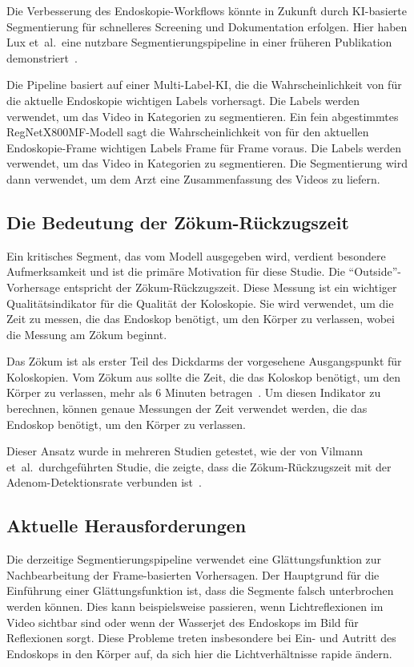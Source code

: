 Die Verbesserung des Endoskopie-Workflows könnte in Zukunft durch KI-basierte Segmentierung für schnelleres Screening und Dokumentation erfolgen. Hier haben Lux et~al.\ eine nutzbare Segmentierungspipeline in einer früheren Publikation demonstriert~\citep{lux-2023}.

Die Pipeline basiert auf einer Multi-Label-KI, die die Wahrscheinlichkeit von für die aktuelle Endoskopie wichtigen Labels vorhersagt. Die Labels werden verwendet, um das Video in Kategorien zu segmentieren. Ein fein abgestimmtes RegNetX800MF-Modell sagt die Wahrscheinlichkeit von für den aktuellen Endoskopie-Frame wichtigen Labels Frame für Frame voraus. Die Labels werden verwendet, um das Video in Kategorien zu segmentieren. Die Segmentierung wird dann verwendet, um dem Arzt eine Zusammenfassung des Videos zu liefern.

\subsection{Die Bedeutung der Zökum-Rückzugszeit}

Ein kritisches Segment, das vom Modell ausgegeben wird, verdient besondere Aufmerksamkeit und ist die primäre Motivation für diese Studie. Die \enquote{Outside}-Vorhersage entspricht der Zökum-Rückzugszeit. Diese Messung ist ein wichtiger Qualitätsindikator für die Qualität der Koloskopie. Sie wird verwendet, um die Zeit zu messen, die das Endoskop benötigt, um den Körper zu verlassen, wobei die Messung am Zökum beginnt. 

Das Zökum ist als erster Teil des Dickdarms der vorgesehene Ausgangspunkt für Koloskopien. Vom Zökum aus sollte die Zeit, die das Koloskop benötigt, um den Körper zu verlassen, mehr als 6 Minuten betragen~\citep{profanter-2020,leung-2019}. Um diesen Indikator zu berechnen, können genaue Messungen der Zeit verwendet werden, die das Endoskop benötigt, um den Körper zu verlassen.

Dieser Ansatz wurde in mehreren Studien getestet, wie der von Vilmann et~al.\ durchgeführten Studie, die zeigte, dass die Zökum-Rückzugszeit mit der Adenom-Detektionsrate verbunden ist~\citep{vilmann-2022}.

\subsection{Aktuelle Herausforderungen}

Die derzeitige Segmentierungspipeline verwendet eine Glättungsfunktion zur Nachbearbeitung der Frame-basierten Vorhersagen. Der Hauptgrund für die Einführung einer Glättungsfunktion ist, dass die Segmente falsch unterbrochen werden können. Dies kann beispielsweise passieren, wenn Lichtreflexionen im Video sichtbar sind oder wenn der Wasserjet des Endoskops im Bild für Reflexionen sorgt.
Diese Probleme treten insbesondere bei Ein- und Autritt des Endoskops in den Körper auf, da sich hier die Lichtverhältnisse rapide ändern.


